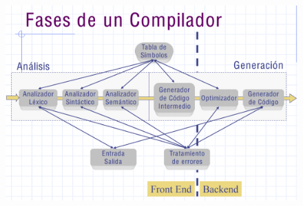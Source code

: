\documentclass[12pt, twoside, openright]{report} %
\begin{document}
\begin{figure}[H]
	{\includegraphics[scale=.27]{Untitled 11.png}}
\end{figure}
\end{document}
